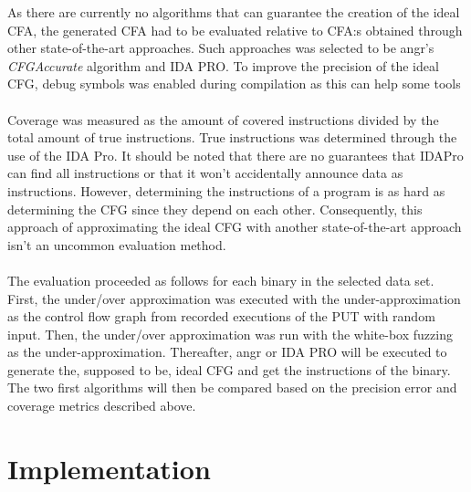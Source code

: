 \documentclass{kththesis}
\begin{document}
\noindent As there are currently no algorithms that can guarantee the creation of the ideal CFA, the generated CFA had to be evaluated relative to CFA:s obtained through other state-of-the-art approaches. Such approaches was selected to be angr's \textit{CFGAccurate} algorithm\cite{angr} and IDA PRO\cite{IDAPro}. To improve the precision of the ideal CFG, debug symbols was enabled during compilation as this can help some tools\cite{alternating}
\\ \\ 
Coverage was measured as the amount of covered instructions divided by the total amount of true instructions. True instructions was determined through the use of the IDA Pro. It should be noted that there are no guarantees that IDAPro can find all instructions or that it won't accidentally announce data as instructions. However, determining the instructions of a program is as hard as determining the CFG since they depend on each other. Consequently, this approach of approximating the ideal CFG with another state-of-the-art approach isn't an uncommon evaluation method\cite{preciseCFG}\cite{alternating}.%
\\ \\
The evaluation proceeded as follows for each binary in the selected data set. First, the under/over approximation was executed with the under-approximation as the control flow graph from recorded executions of the PUT with random input. Then, the under/over approximation was run with the white-box fuzzing as the under-approximation. Thereafter, angr or IDA PRO will be executed to generate the, supposed to be, ideal CFG and get the instructions of the binary. The two first algorithms will then be compared based on the precision error and coverage metrics described above.

\section{Implementation}


\end{document}
